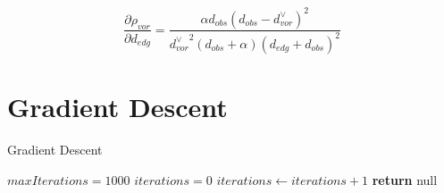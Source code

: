 \begin{equation}
\frac{\partial\rho_{vor}}{\partial d_{edg}} =  \frac{\alpha d_{obs}\left(d_{obs}-d_{vor}^{\lor}\right)^2}{{d_{vor}^{\lor}}^2\left(d_{obs}+\alpha\right)\left(d_{edg}+d_{obs}\right)^2}
\end{equation}

\section{Gradient Descent}


\begin{algorithm}
    \caption{Gradient Descent}\label{alg:gradientDescent}
    \begin{algorithmic}[1]
    \State $maxIterations = 1000$
    \State $iterations = 0$
        \State $iterations \gets iterations + 1$
        \EndWhile
        \State \textbf{return} null
    \end{algorithmic}
\end{algorithm}